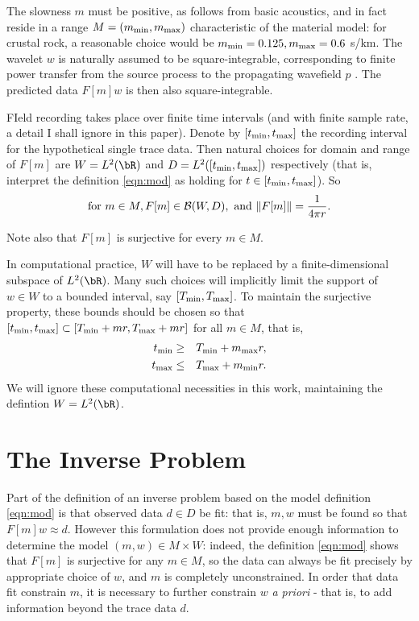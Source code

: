 The slowness $m$ must be positive, as follows from basic acoustics,
and in fact reside in a range $M=(m_{\rm min}, m_{\rm max})$ characteristic of the
material model: for crustal rock, a reasonable choice would be
$m_{\rm min}=0.125, m_{\rm max}=0.6$ s/km. The wavelet $w$ is
naturally assumed to be 
square-integrable, corresponding to finite power transfer from the
source process to the propagating wavefield $p$
\cite[]{SantosaSymes:00}. The predicted data $F[m]w$ is then also
square-integrable.

FIeld recording takes place over finite time intervals (and with
finite sample rate, a detail I shall ignore in this paper). Denote by
$[t_{\rm min},t_{\rm max}]$ the recording interval for the
hypothetical single trace data. Then natural choices for domain and
range of $F[m]$ are $W = L^2(\bR)$ and $D=L^2([t_{\rm min},t_{\rm
  max}])$ respectively (that is, interpret the definition \ref{eqn:mod}
as holding for $t \in [t_{\rm min},t_{\rm  max}]$). So
\begin{equation}
  \label{eqn:mapprop}
  \mbox{for }m \in M, F[m] \in {\cal B}(W,D),\mbox{ and }\|F[m]\| =
  \frac{1}{4\pi r}.
\end{equation}

Note also that $F[m]$ is surjective for every $m \in M$.

In computational practice, $W$ will have to be replaced by a
finite-dimensional subspace of $L^2(\bR)$. Many such choices will
implicitly limit the support of $w \in W$ to a bounded interval, say
$[T_{\rm min},T_{\rm max}]$. To maintain the surjective property,
these bounds should be chosen so that $[t_{\rm min}, t_{\rm max}]
\subset [T_{\rm min}+mr,T_{\rm max}+mr]$ for all $m \in M$, that is,
\begin{eqnarray}
  \label{eqn:dombounds}
  t_{\rm min} &\ge & T_{\rm min}+m_{\rm max}r,\nonumber\\
  t_{\rm max} &\le & T_{\rm max}+m_{\rm min}r.
\end{eqnarray}
We will ignore these computational necessities in this work,
maintaining the defintion $W=L^2(\bR)$.

\section{The Inverse Problem}

Part of the definition of an inverse problem based on the model
definition \ref{eqn:mod} is that observed data $d \in D$ be fit: that
is, $m, w$ must be found so that $F[m]w \approx d$. However this
formulation does not provide enough information to determine the model
$(m,w) \in M \times W$: indeed, the definition
\ref{eqn:mod} shows that $F[m]$ is surjective for any $m \in M$, so
the data can always be fit precisely by appropriate choice of $w$, and
$m$ is completely
unconstrained.  In order that data fit constrain $m$, it is necessary
to further constrain $w$ {\em a priori} - that is, to add information
beyond the trace data $d$.

